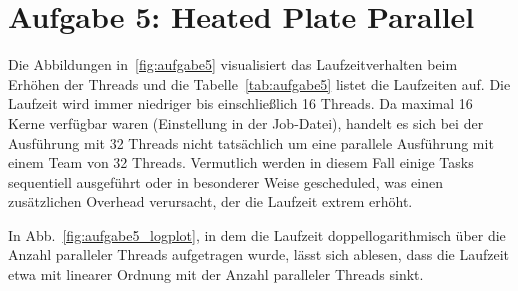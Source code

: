\chapter{Aufgabe 5: Heated Plate Parallel}

Die Abbildungen in~\ref{fig:aufgabe5} visualisiert das Laufzeitverhalten beim Erhöhen der Threads und die Tabelle~\ref{tab:aufgabe5} listet die Laufzeiten auf. Die Laufzeit wird immer niedriger bis einschließlich 16 Threads. Da maximal 16 Kerne verfügbar waren (Einstellung in der Job-Datei), handelt es sich bei der Ausführung mit 32 Threads nicht tatsächlich um eine parallele Ausführung mit einem Team von 32 Threads. Vermutlich werden in diesem Fall einige Tasks sequentiell ausgeführt oder in besonderer Weise gescheduled, was einen zusätzlichen Overhead verursacht, der die Laufzeit extrem erhöht.

In Abb.~\ref{fig:aufgabe5_logplot}, in dem die Laufzeit doppellogarithmisch über die Anzahl paralleler Threads aufgetragen wurde, lässt sich ablesen, dass die Laufzeit etwa mit linearer Ordnung mit der Anzahl paralleler Threads sinkt.

